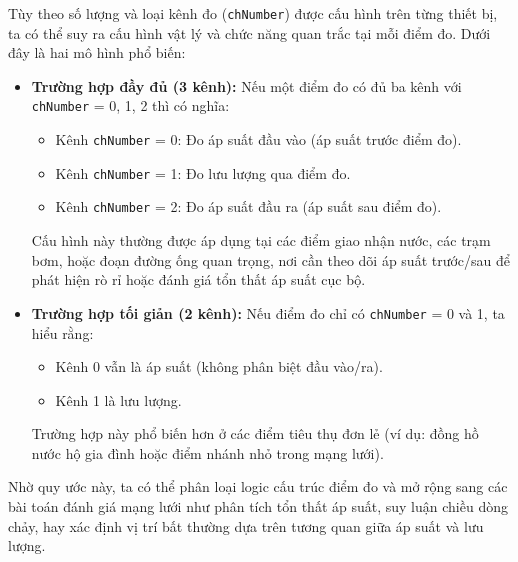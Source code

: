 Tùy theo số lượng và loại kênh đo (\texttt{chNumber}) được cấu hình trên từng thiết bị, ta có thể suy ra cấu hình vật lý và chức năng quan trắc tại mỗi điểm đo. Dưới đây là hai mô hình phổ biến:

\begin{itemize}
    \item \textbf{Trường hợp đầy đủ (3 kênh):} Nếu một điểm đo có đủ ba kênh với \texttt{chNumber} = 0, 1, 2 thì có nghĩa:
    \begin{itemize}
        \item Kênh \texttt{chNumber} = 0: Đo áp suất đầu vào (áp suất trước điểm đo).
        \item Kênh \texttt{chNumber} = 1: Đo lưu lượng qua điểm đo.
        \item Kênh \texttt{chNumber} = 2: Đo áp suất đầu ra (áp suất sau điểm đo).
    \end{itemize}
    Cấu hình này thường được áp dụng tại các điểm giao nhận nước, các trạm bơm, hoặc đoạn đường ống quan trọng, nơi cần theo dõi áp suất trước/sau để phát hiện rò rỉ hoặc đánh giá tổn thất áp suất cục bộ.
    
    \item \textbf{Trường hợp tối giản (2 kênh):} Nếu điểm đo chỉ có \texttt{chNumber} = 0 và 1, ta hiểu rằng:
    \begin{itemize}
        \item Kênh 0 vẫn là áp suất (không phân biệt đầu vào/ra).
        \item Kênh 1 là lưu lượng.
    \end{itemize}
    Trường hợp này phổ biến hơn ở các điểm tiêu thụ đơn lẻ (ví dụ: đồng hồ nước hộ gia đình hoặc điểm nhánh nhỏ trong mạng lưới).
\end{itemize}

Nhờ quy ước này, ta có thể phân loại logic cấu trúc điểm đo và mở rộng sang các bài toán đánh giá mạng lưới như phân tích tổn thất áp suất, suy luận chiều dòng chảy, hay xác định vị trí bất thường dựa trên tương quan giữa áp suất và lưu lượng.




